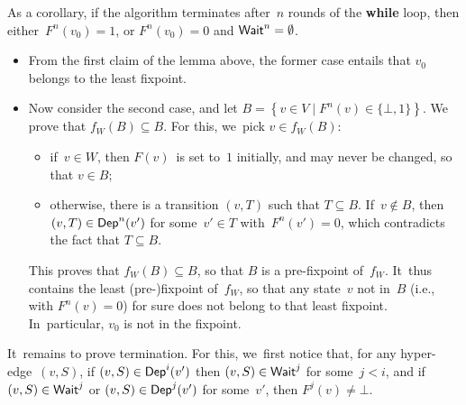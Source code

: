 As a corollary, if the algorithm terminates after~$n$ rounds of the
\textbf{while} loop, then either~$F^n(v_0)=1$, or
$F^n(v_0)=0$ and $\textsf{Wait}^n=\emptyset$.
\begin{itemize}
\item From the first claim of the lemma above, the former case entails
  that $v_0$ belongs to the least fixpoint.
\item Now consider the second case, and let $B=\left\{v\in V\mid
  F^n(v)\in \{\bot,1\}\right\}$. We prove that $f_W(B)\subseteq
  B$. For this, we~pick $v\in f_W(B)$:
  \begin{itemize}
  \item if~$v\in W$, then $F(v)$~is set to~$1$ initially, and may
    never be changed, so that $v\in B$;
  \item otherwise, there is a transition $(v,T)$ such that $T\subseteq
    B$. If~$v\notin B$, then $(v,T)\in\textsf{Dep}^n(v')$ for some~$v'\in T$
    with~$F^n(v')=0$, which contradicts the fact that $T\subseteq B$.
  \end{itemize}
  This proves that $f_W(B)\subseteq B$, so that $B$ is a pre-fixpoint
  of~$f_W$. It~thus contains the least (pre-)fixpoint of~$f_W$, so
  that any state~$v$ not in~$B$ (i.e., with $F^n(v)=0$) for sure does
  not belong to that least fixpoint. In~particular, $v_0$ is not in
  the fixpoint.
\end{itemize}



\medskip
It~remains to prove termination. For this, we~first notice that, for
any hyper-edge~$(v,S)$, if $(v,S)\in\textsf{Dep}^i(v')$ then $(v,S)\in\textsf{Wait}^j$
for some~$j < i$, and if $(v,S)\in\textsf{Wait}^j$ or $(v,S)\in\textsf{Dep}^j(v')$ for
some~$v'$, then $F^j(v)\not=\bot$.

